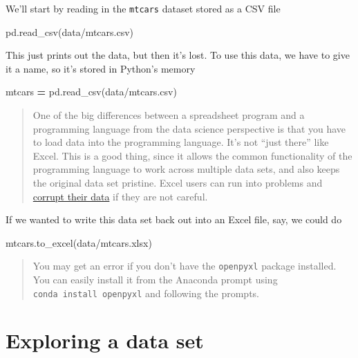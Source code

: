 \documentclass[
  letterpaper,
]{scrbook}
\newenvironment{Shaded}{\begin{snugshade}}{\end{snugshade}}
\newcommand{\NormalTok}[1]{#1}
\newcommand{\OperatorTok}[1]{\textcolor[rgb]{0.81,0.36,0.00}{\textbf{#1}}}
\newcommand{\StringTok}[1]{\textcolor[rgb]{0.31,0.60,0.02}{#1}}
\begin{document}
We'll start by reading in the \texttt{mtcars} dataset stored as a CSV file

\begin{Shaded}
\begin{Highlighting}[]
\NormalTok{pd.read\_csv(}\StringTok{\textquotesingle{}data/mtcars.csv\textquotesingle{}}\NormalTok{)}
\end{Highlighting}
\end{Shaded}

This just prints out the data, but then it's lost. To use this data, we have to give it a name, so it's stored in Python's memory

\begin{Shaded}
\begin{Highlighting}[]
\NormalTok{mtcars }\OperatorTok{=}\NormalTok{ pd.read\_csv(}\StringTok{\textquotesingle{}data/mtcars.csv\textquotesingle{}}\NormalTok{)}
\end{Highlighting}
\end{Shaded}

\begin{quote}
One of the big differences between a spreadsheet program and a programming language from the data science perspective is that you have to load data into the programming language. It's not ``just there'' like Excel. This is a good thing, since it allows the common functionality of the programming language to work across multiple data sets, and also keeps the original data set pristine. Excel users can run into problems and \href{https://nature.berkeley.edu/garbelottoat/?p=1488}{corrupt their data} if they are not careful.
\end{quote}

If we wanted to write this data set back out into an Excel file, say, we could do

\begin{Shaded}
\begin{Highlighting}[]
\NormalTok{mtcars.to\_excel(}\StringTok{\textquotesingle{}data/mtcars.xlsx\textquotesingle{}}\NormalTok{)}
\end{Highlighting}
\end{Shaded}

\begin{quote}
You may get an error if you don't have the \texttt{openpyxl} package installed. You can easily install it from the Anaconda prompt using \texttt{conda\ install\ openpyxl} and following the prompts.
\end{quote}

\hypertarget{exploring-a-data-set}{%
\section{Exploring a data set}\label{exploring-a-data-set}}
\end{document}
